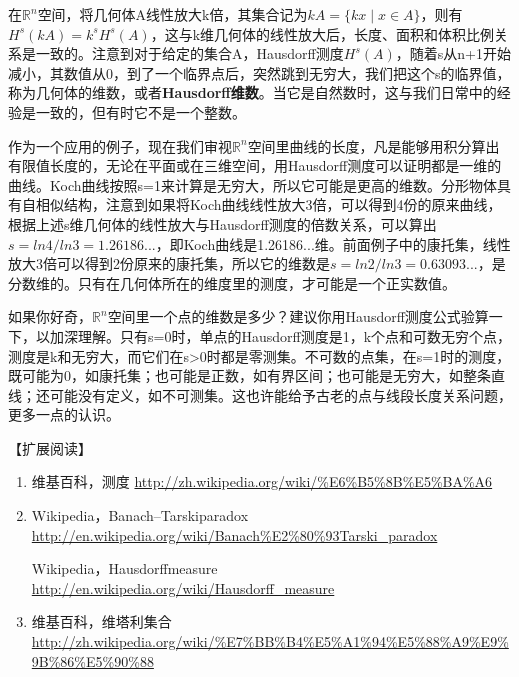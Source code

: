 在$ \mathbb{R}^n $空间，将几何体A线性放大k倍，其集合记为$ kA =\{kx \; | \; x\in A\} $，则有 $ H^s(kA)=k^sH^s(A) $，这与k维几何体的线性放大后，长度、面积和体积比例关系是一致的。注意到对于给定的集合A，Hausdorff测度$ H^s(A) $，随着s从n+1开始减小，其数值从0，到了一个临界点后，突然跳到无穷大，我们把这个s的临界值，称为几何体的维数，或者\textbf{Hausdorff维数}。当它是自然数时，这与我们日常中的经验是一致的，但有时它不是一个整数。

作为一个应用的例子，现在我们审视$ \mathbb{R}^n $空间里曲线的长度，凡是能够用积分算出有限值长度的，无论在平面或在三维空间，用Hausdorff测度可以证明都是一维的曲线。Koch曲线按照s=1来计算是无穷大，所以它可能是更高的维数。分形物体具有自相似结构，注意到如果将Koch曲线线性放大3倍，可以得到4份的原来曲线，根据上述s维几何体的线性放大与Hausdorff测度的倍数关系，可以算出$ s=ln4/ln3=1.26186... $，即Koch曲线是1.26186...维。前面例子中的康托集，线性放大3倍可以得到2份原来的康托集，所以它的维数是$ s=ln2/ln3=0.63093... $，是分数维的。只有在几何体所在的维度里的测度，才可能是一个正实数值。

如果你好奇，$ \mathbb{R}^n $空间里一个点的维数是多少？建议你用Hausdorff测度公式验算一下，以加深理解。只有s=0时，单点的Hausdorff测度是1，k个点和可数无穷个点，测度是k和无穷大，而它们在s>0时都是零测集。不可数的点集，在s=1时的测度，既可能为0，如康托集；也可能是正数，如有界区间；也可能是无穷大，如整条直线；还可能没有定义，如不可测集。这也许能给予古老的点与线段长度关系问题，更多一点的认识。

【扩展阅读】
\begin{enumerate}
	\item 维基百科，测度
	\url{http://zh.wikipedia.org/wiki/\%E6\%B5\%8B\%E5\%BA\%A6}
	
	\item  Wikipedia，Banach–Tarskiparadox \url{http://en.wikipedia.org/wiki/Banach\%E2\%80\%93Tarski_paradox}
	
	Wikipedia，Hausdorffmeasure 
	\url{http://en.wikipedia.org/wiki/Hausdorff\_measure}
	
	\item 维基百科，维塔利集合
	\url{http://zh.wikipedia.org/wiki/\%E7\%BB\%B4\%E5\%A1\%94\%E5\%88\%A9\%E9\%9B\%86\%E5\%90\%88}
	
\end{enumerate}

